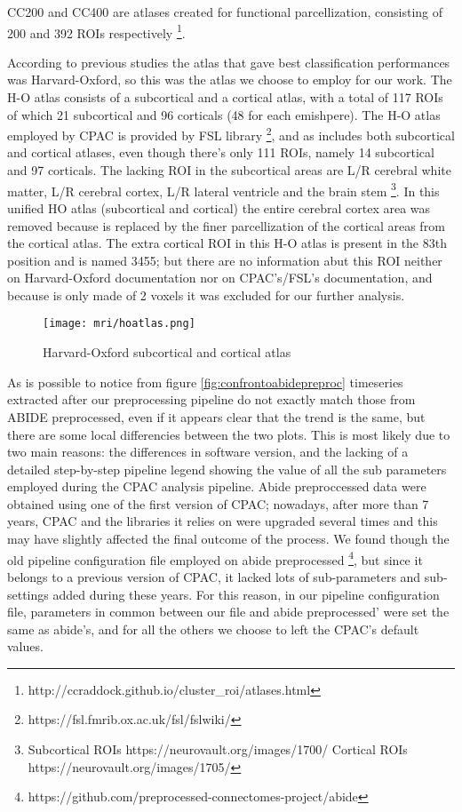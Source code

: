 \documentclass[a4paper,11pt]{article}
\begin{document}
CC200 and CC400 are atlases created for functional parcellization, consisting of 200 and 392 ROIs respectively \footnote{http://ccraddock.github.io/cluster\_roi/atlases.html}.

According to previous studies \cite{spera-2019} the atlas that gave best classification performances was Harvard-Oxford, so this was the atlas we choose to employ for our work.
The H-O atlas consists of a subcortical and a cortical atlas, with a total of 117 ROIs of which 21 subcortical and 96 corticals (48 for each emishpere).
The H-O atlas employed by CPAC is provided by FSL library \footnote{https://fsl.fmrib.ox.ac.uk/fsl/fslwiki/}, and as includes both subcortical and cortical atlases, even though there's only 111 ROIs, namely 14 subcortical and 97 corticals.
The lacking ROI in the subcortical areas are L/R cerebral white matter, L/R cerebral cortex, L/R lateral ventricle and the brain stem \footnote{Subcortical ROIs https://neurovault.org/images/1700/ \quad Cortical ROIs https://neurovault.org/images/1705/ }.
In this unified HO atlas (subcortical and cortical) the entire cerebral cortex area was removed because is replaced by the finer parcellization of the cortical areas from the cortical atlas.
The extra cortical ROI in this H-O atlas is present in the 83th position and is named 3455; but there are no information abut this ROI neither on Harvard-Oxford documentation nor on CPAC's/FSL's documentation, and because is only made of 2 voxels it was excluded for our further analysis.

\begin{figure}[h]
\centering
\texttt{[image: mri/hoatlas.png]}
\caption{Harvard-Oxford subcortical and cortical atlas}
\label{fig:hoatlas}
\end{figure}


As is possible to notice from figure \ref{fig:confrontoabidepreproc} timeseries extracted after our preprocessing pipeline do not exactly match those from ABIDE preprocessed, even if it appears clear that the trend is the same, but there are some local differencies between the two plots.
This is most likely due to two main reasons: the differences in software version, and the lacking of a detailed step-by-step pipeline legend showing the value of all the sub parameters employed during the CPAC analysis pipeline.
Abide preproccessed data were obtained using one of the first version of CPAC; nowadays, after more than 7 years, CPAC and the libraries it relies on were upgraded several times and this may have slightly affected the final outcome of the process.
We found though the old pipeline configuration file employed on abide preprocessed \footnote{https://github.com/preprocessed-connectomes-project/abide}, but since it belongs to a previous version of CPAC, it lacked lots of sub-parameters and sub-settings added during these years.
For this reason, in our pipeline configuration file, parameters in common between our file and abide preprocessed' were set the same as abide's, and for all the others we choose to left the CPAC's default values.
\end{document}
